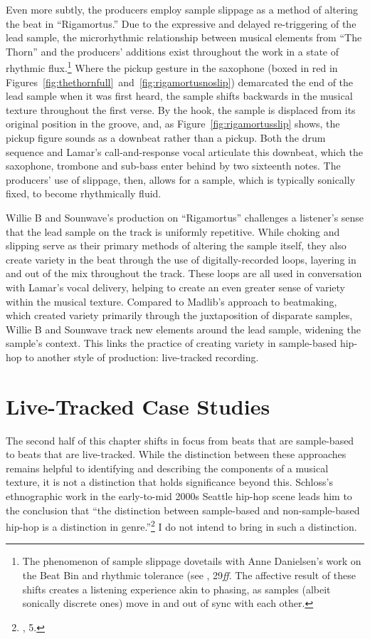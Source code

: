 Even more subtly, the producers employ sample slippage as a method of altering the beat in ``Rigamortus.''
Due to the expressive and delayed re-triggering of the lead sample, the microrhythmic relationship 
between musical elements from ``The Thorn'' and the producers' additions exist throughout the work 
in a state of rhythmic flux.\footnote{The phenomenon of sample slippage dovetails with Anne Danielsen's 
work on the Beat Bin and rhythmic tolerance (see \cite{annedanielsenHereThereEverywhere2016}, 
29\textit{ff}. The affective result of these shifts creates a listening experience akin to phasing, 
as samples (albeit sonically discrete ones) move in and out of sync with each other.} Where the pickup
gesture in the saxophone (boxed in red in Figures~\ref{fig:thethornfull}~and~\ref{fig:rigamortusnoslip})
demarcated the end of the lead sample when it was first heard, the sample shifts backwards in the musical
texture throughout the first verse. By the hook, the sample is displaced from its original position in 
the groove, and, as Figure~\ref{fig:rigamortusslip} shows, the pickup figure sounds as a downbeat rather
than a pickup. Both the drum sequence and Lamar's call-and-response vocal articulate this downbeat, which
the saxophone, trombone and sub-bass enter behind by two sixteenth notes. The producers' use of slippage,
then, allows for a sample, which is typically sonically fixed, to become rhythmically fluid.

Willie B and Sounwave's production on ``Rigamortus'' challenges a listener's sense that the lead 
sample on the track is uniformly repetitive. While choking and slipping serve as their primary methods
of altering the sample itself, they also create variety in the beat through the use of digitally-recorded
loops, layering in and out of the mix throughout the track. These loops are all used in conversation 
with Lamar's vocal delivery, helping to create an even greater sense of variety within the musical 
texture. Compared to Madlib's approach to beatmaking, which created variety primarily through the
juxtaposition of disparate samples, Willie B and Sounwave track new elements around the lead sample, 
widening the sample's context. This links the practice of creating variety in sample-based hip-hop 
to another style of production: live-tracked recording.

\section{Live-Tracked Case Studies}
The second half of this chapter shifts in focus from beats that are sample-based to beats that are
live-tracked. While the distinction between these approaches remains helpful to identifying and describing
the components of a musical texture, it is not a distinction that holds significance beyond this. 
Schloss's ethnographic work in the early-to-mid 2000s Seattle hip-hop scene leads him to the conclusion
that ``the distinction between sample-based and non-sample-based hip-hop is a distinction in
genre.''\footnote{\cite{josephgschlossMakingBeatsArt2004}, 5.} I do not intend to bring in 
such a distinction.

